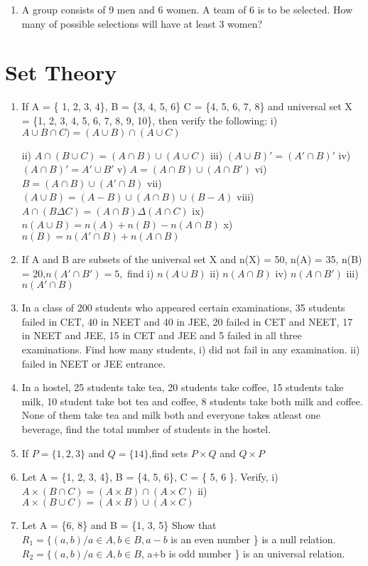 \documentclass[14pt]{article}
\begin{document}
\begin{multicols}{2}
\begin{enumerate}[resume]
 \item A group consists of 9 men and 6 women.
A team of 6 is to be selected. How many
of possible selections will have at least
3 women?
\end{enumerate} 


\section{Set Theory}
\noindent
\begin{enumerate}[resume]

\item  If A = \{ 1, 2, 3, 4\}, B = \{3, 4, 5, 6\}
		  C = \{4, 5, 6, 7, 8\} and universal set  X = \{1, 2, 3, 4, 5, 6, 7, 8, 9, 10\}, then verify
the following:
i)		$ A \cup B\cap C) = (A\cup B) \cap (A \cup C)$

ii)	$A\cap (B\cup C)=(A\cap B)\cup (A \cup C)$
iii) $(A\cup B)' = (A'\cap B)'         $
iv)	$ (A\cap B)' = A'\cup B'          $
v)	$	 A = (A\cap B)\cup (A\cap B') $
vi)	$	 B = (A\cap B)\cup (A'\cap B) $
vii) $(A\cup B)=(A-B)\cup (A\cap B)\cup (B-A)$
viii)	$A \cap (B\Delta C) = (A\cap B) \Delta (A\cap C)$
ix) $n (A\cup B) = n(A) + n(B) - n(A\cap B)$ 
x) $n (B) = n(A'\cap B) + n(A\cap B)$

\item If A and B are subsets of the universal set X and n(X) = 50, n(A) = 35, n(B) = 20,$ n(A'\cap B') = 5,$ find i) $n (A\cup B)$ ii) $n(A\cap B)$
iv) $ n(A\cap B')$
iii) $ n(A'\cap B) $

\item In a class of 200 students who appeared
certain examinations, 35 students failed
in CET, 40 in NEET and 40 in JEE,
20 failed in CET and NEET, 17 in NEET
and JEE, 15 in CET and JEE and 5 failed
in all three examinations. Find how many
students,
i)	did not fail in any examination.
ii) failed in NEET or JEE entrance.
		 
		 
\item In a hostel, 25 students take tea, 20 students
take coffee, 15 students take milk, 10
student take bot tea and coffee, 8 students
take both milk and coffee. None of them
take tea and milk both and everyone takes
atleast one beverage, find the total number
of students in the hostel.

\item If $P = \{1, 2, 3 \} $ and $Q = \{14 \}$,find sets $P \times Q $ and $Q \times P$

\item Let A = \{1, 2, 3, 4\}, B = \{4, 5, 6\}, C = \{ 5, 6 \}.
 Verify, i) $A \times (B \cap C) = (A \times B) \cap (A \times C)$				
ii) $ A \times (B \cup C) = (A \times B) \cup (A \times C)$

\item Let A = \{6, 8\} and B = \{1, 3, 5\} Show that $ R_1 = \{ (a, b) / a \in A, b\in B, a - b$
is an even number \} is a null relation.
$R_2 = \{(a, b)/a \in A, b \in B$, a+b is odd number \}
is an universal relation.
\end{enumerate} 



\end{multicols}
 
\end{document}
